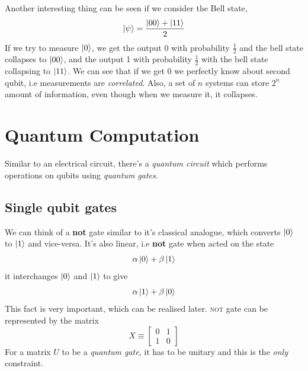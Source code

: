 Another interesting thing can be seen if we consider the Bell state,
\begin{equation}
    \ket{\psi} = \frac{\ket{00}+\ket{11}}{2}
\end{equation}
If we try to measure $\ket{0}$, we get the output 0 with probability $\frac{1}{2}$ and the bell state collapses to $\ket{00}$, and the output 1 with probability $\frac{1}{2}$ with the bell state collapsing to $\ket{11}$. We can see that if we get 0 we perfectly know about second qubit, i.e measurements are \textit{correlated}. Also, a set of $n$ systems can store $2^n$ amount of information, even though when we measure it, it collapses.

\section{Quantum Computation}
Similar to an electrical circuit, there's a \textit{quantum circuit} which performs operations on qubits using \textit{quantum gates}.
\subsection{Single qubit gates}
We can think of a \textbf{not} gate similar to it's classical analogue, which converts $\ket{0}$ to $\ket{1}$  and vice-versa. It's also linear, i.e \textbf{not} gate when acted on the state
\begin{equation}
    \alpha\ket{0} + \beta\ket{1}
\end{equation}
it interchanges $\ket{0}$ and $\ket{1}$ to give
\begin{equation}
    \alpha\ket{1} + \beta\ket{0}
\end{equation}
This fact is very important, which can be realised later. \textsc{not} gate can be represented by the matrix
\begin{equation}
    X \equiv \begin{bmatrix}
        0 & 1 \\ 1 & 0
    \end{bmatrix}
\end{equation}
For a matrix $U$ to be a \textit{quantum gate}, it has to be unitary and this is the \textit{only} constraint.

